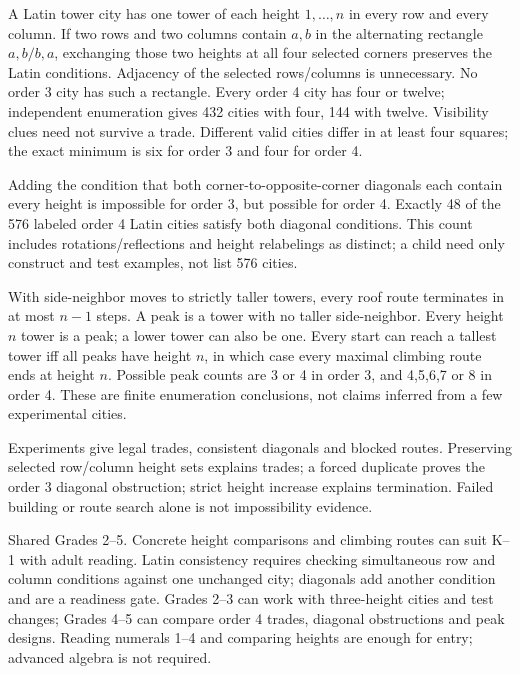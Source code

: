 A Latin tower city has one tower of each height $1,\ldots,n $ in every row and every column. If two rows and two columns contain $a,b $ in the alternating rectangle $a,b/b,a $, exchanging those two heights at all four selected corners preserves the Latin conditions. Adjacency of the selected rows/columns is unnecessary. No order 3 city has such a rectangle. Every order 4 city has four or twelve; independent enumeration gives 432 cities with four, 144 with twelve. Visibility clues need not survive a trade. Different valid cities differ in at least four squares; the exact minimum is six for order 3 and four for order 4.

Adding the condition that both corner-to-opposite-corner diagonals each contain every height is impossible for order 3, but possible for order 4. Exactly 48 of the 576 labeled order 4 Latin cities satisfy both diagonal conditions. This count includes rotations/reflections and height relabelings as distinct; a child need only construct and test examples, not list 576 cities.

With side-neighbor moves to strictly taller towers, every roof route terminates in at most $n-1$ steps. A peak is a tower with no taller side-neighbor. Every height $n $ tower is a peak; a lower tower can also be one. Every start can reach a tallest tower iff all peaks have height $n $, in which case every maximal climbing route ends at height $n $. Possible peak counts are 3 or 4 in order 3, and 4,5,6,7 or 8 in order 4. These are finite enumeration conclusions, not claims inferred from a few experimental cities.

Experiments give legal trades, consistent diagonals and blocked routes. Preserving selected row/column height sets explains trades; a forced duplicate proves the order 3 diagonal obstruction; strict height increase explains termination. Failed building or route search alone is not impossibility evidence.

Shared Grades 2--5. Concrete height comparisons and climbing routes can suit K--1 with adult reading. Latin consistency requires checking simultaneous row and column conditions against one unchanged city; diagonals add another condition and are a readiness gate. Grades 2--3 can work with three-height cities and test changes; Grades 4--5 can compare order 4 trades, diagonal obstructions and peak designs. Reading numerals 1--4 and comparing heights are enough for entry; advanced algebra is not required.

